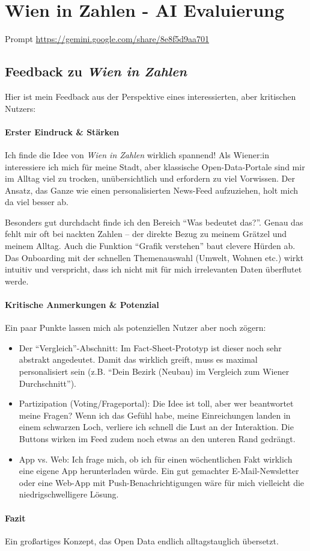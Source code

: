 \section{Wien in Zahlen - AI Evaluierung}
Prompt \url{https://gemini.google.com/share/8e8f5d9aa701}

\subsection{Feedback zu \textit{Wien in Zahlen}}

Hier ist mein Feedback aus der Perspektive eines interessierten, aber kritischen Nutzers:

\paragraph{Erster Eindruck \& St\"arken}

Ich finde die Idee von \textit{Wien in Zahlen} wirklich spannend! Als Wiener:in interessiere ich mich f\"ur meine Stadt, aber klassische Open-Data-Portale sind mir im Alltag viel zu trocken, un\"ubersichtlich und erfordern zu viel Vorwissen. Der Ansatz, das Ganze wie einen personalisierten News-Feed aufzuziehen, holt mich da viel besser ab.

Besonders gut durchdacht finde ich den Bereich ``Was bedeutet das?''. Genau das fehlt mir oft bei nackten Zahlen -- der direkte Bezug zu meinem Gr\"atzel und meinem Alltag. Auch die Funktion ``Grafik verstehen'' baut clevere H\"urden ab. Das Onboarding mit der schnellen Themenauswahl (Umwelt, Wohnen etc.) wirkt intuitiv und verspricht, dass ich nicht mit f\"ur mich irrelevanten Daten \"uberflutet werde.

\paragraph{Kritische Anmerkungen \& Potenzial}

Ein paar Punkte lassen mich als potenziellen Nutzer aber noch z\"ogern:

\begin{itemize}
    \item Der ``Vergleich''-Abschnitt: Im Fact-Sheet-Prototyp ist dieser noch sehr abstrakt angedeutet. Damit das wirklich greift, muss es maximal personalisiert sein (z.B. ``Dein Bezirk (Neubau) im Vergleich zum Wiener Durchschnitt'').

    \item Partizipation (Voting/Frageportal): Die Idee ist toll, aber wer beantwortet meine Fragen? Wenn ich das Gef\"uhl habe, meine Einreichungen landen in einem schwarzen Loch, verliere ich schnell die Lust an der Interaktion. Die Buttons wirken im Feed zudem noch etwas an den unteren Rand gedr\"angt.

    \item App vs. Web: Ich frage mich, ob ich f\"ur einen w\"ochentlichen Fakt wirklich eine eigene App herunterladen w\"urde. Ein gut gemachter E-Mail-Newsletter oder eine Web-App mit Push-Benachrichtigungen w\"are f\"ur mich vielleicht die niedrigschwelligere L\"osung.
\end{itemize}

\paragraph{Fazit}

Ein gro{\ss}artiges Konzept, das Open Data endlich alltagstauglich \"ubersetzt.
